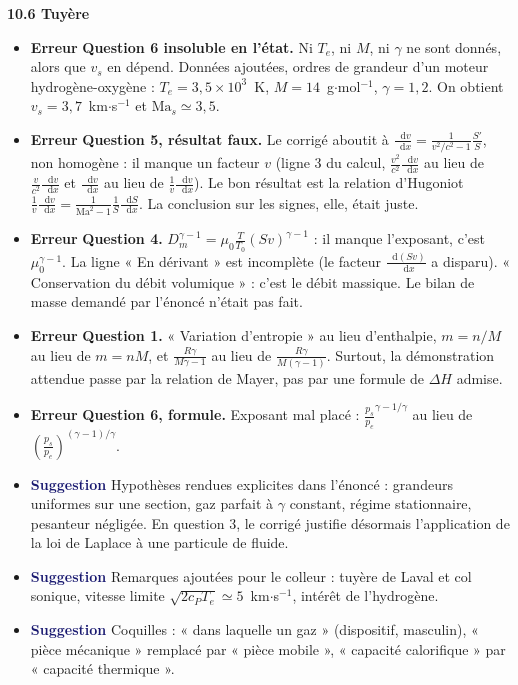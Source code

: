 \documentclass[a4paper,11pt]{article}
\newcommand*\dif{\mathop{}\!\mathrm{d}}
\newcommand{\exo}[1]{\vspace{0.7\baselineskip}\noindent\textbf{\large #1}\par\nopagebreak\vspace{0.2\baselineskip}}
\newcommand{\erreur}{\textcolor{BrickRed}{\textbf{Erreur}}}
\newcommand{\suggestion}{\textcolor{MidnightBlue}{\textbf{Suggestion}}}
\begin{document}
\exo{10.6 Tuyère}

\begin{itemize}
	\item \erreur{} \textbf{Question 6 insoluble en l'état.} Ni $T_e$, ni $M$, ni $\gamma$ ne sont
	donnés, alors que $v_s$ en dépend. Données ajoutées, ordres de grandeur d'un moteur
	hydrogène-oxygène : $T_e=3{,}5\times10^{3}$~K, $M=14$~g$\cdot$mol$^{-1}$, $\gamma=1{,}2$.
	On obtient $v_s=3{,}7$~km$\cdot$s$^{-1}$ et $\mathrm{Ma}_s\simeq3{,}5$.
	\item \erreur{} \textbf{Question 5, résultat faux.} Le corrigé aboutit à
	$\frac{\dif v}{\dif x}=\frac{1}{v^2/c^2-1}\frac{S'}{S}$, non homogène : il manque un facteur $v$
	(ligne 3 du calcul, $\frac{v^2}{c^2}\frac{\dif v}{\dif x}$ au lieu de $\frac{v}{c^2}\frac{\dif v}{\dif x}$
	et $\frac{\dif v}{\dif x}$ au lieu de $\frac{1}{v}\frac{\dif v}{\dif x}$). Le bon résultat est la
	relation d'Hugoniot $\frac{1}{v}\frac{\dif v}{\dif x}=\frac{1}{\mathrm{Ma}^2-1}\frac{1}{S}\frac{\dif S}{\dif x}$.
	La conclusion sur les signes, elle, était juste.
	\item \erreur{} \textbf{Question 4.} $D_m^{\gamma-1}=\mu_0\frac{T}{T_0}(Sv)^{\gamma-1}$ : il manque
	l'exposant, c'est $\mu_0^{\gamma-1}$. La ligne « En dérivant » est incomplète (le facteur
	$\frac{\dif(Sv)}{\dif x}$ a disparu). « Conservation du débit volumique » : c'est le débit
	massique. Le bilan de masse demandé par l'énoncé n'était pas fait.
	\item \erreur{} \textbf{Question 1.} « Variation d'entropie » au lieu d'enthalpie, $m=n/M$ au lieu
	de $m=nM$, et $\frac{R\gamma}{M\gamma-1}$ au lieu de $\frac{R\gamma}{M(\gamma-1)}$. Surtout, la
	démonstration attendue passe par la relation de Mayer, pas par une formule de $\Delta H$ admise.
	\item \erreur{} \textbf{Question 6, formule.} Exposant mal placé :
	$\frac{p_s}{p_e}^{\gamma-1/\gamma}$ au lieu de $\left(\frac{p_s}{p_e}\right)^{(\gamma-1)/\gamma}$.
	\item \suggestion{} Hypothèses rendues explicites dans l'énoncé : grandeurs uniformes sur une
	section, gaz parfait à $\gamma$ constant, régime stationnaire, pesanteur négligée. En question 3,
	le corrigé justifie désormais l'application de la loi de Laplace à une particule de fluide.
	\item \suggestion{} Remarques ajoutées pour le colleur : tuyère de Laval et col sonique, vitesse
	limite $\sqrt{2c_PT_e}\simeq5$~km$\cdot$s$^{-1}$, intérêt de l'hydrogène.
	\item \suggestion{} Coquilles : « dans laquelle un gaz » (dispositif, masculin), « pièce
	mécanique » remplacé par « pièce mobile », « capacité calorifique » par « capacité thermique ».
\end{itemize}
\end{document}
